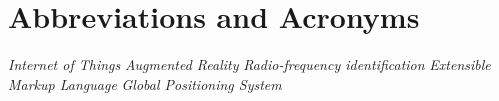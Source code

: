 \documentclass[conference]{IEEEtran}
\begin{document}
\section*{Abbreviations and Acronyms}
\begin{acronym}[Bash]
 {\textit{Internet of Things}}
 {\textit{Augmented Reality}}
 {\textit{Radio-frequency identification}}
 {\textit{Extensible Markup Language}}
 {\textit{Global Positioning System}}
\end{acronym}

\printbibliography
\end{document}
